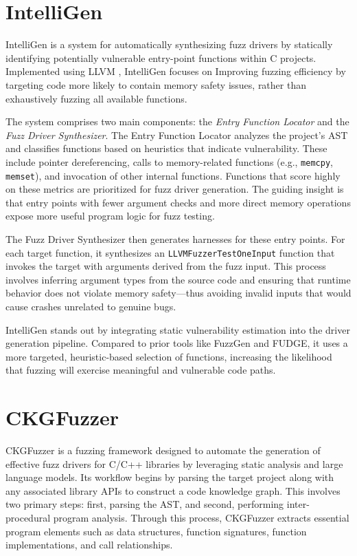 \documentclass[
  a4paper,
]{scrreprt}
\theoremstyle{definition}
\theoremstyle{remark}
\begin{document}
\section{IntelliGen}\label{intelligen}

IntelliGen \autocite{zhang2021} is a system for automatically
synthesizing fuzz drivers by statically identifying potentially
vulnerable entry-point functions within C projects. Implemented using
LLVM \autocite{llvm}, IntelliGen focuses on Improving fuzzing efficiency
by targeting code more likely to contain memory safety issues, rather
than exhaustively fuzzing all available functions.

The system comprises two main components: the \emph{Entry Function
Locator} and the \emph{Fuzz Driver Synthesizer}. The Entry Function
Locator analyzes the project's AST and classifies functions based on
heuristics that indicate vulnerability. These include pointer
dereferencing, calls to memory-related functions (e.g., \texttt{memcpy},
\texttt{memset}), and invocation of other internal functions. Functions
that score highly on these metrics are prioritized for fuzz driver
generation. The guiding insight is that entry points with fewer argument
checks and more direct memory operations expose more useful program
logic for fuzz testing.

The Fuzz Driver Synthesizer then generates harnesses for these entry
points. For each target function, it synthesizes an
\texttt{LLVMFuzzerTestOneInput} function that invokes the target with
arguments derived from the fuzz input. This process involves inferring
argument types from the source code and ensuring that runtime behavior
does not violate memory safety---thus avoiding invalid inputs that would
cause crashes unrelated to genuine bugs.

IntelliGen stands out by integrating static vulnerability estimation
into the driver generation pipeline. Compared to prior tools like
FuzzGen and FUDGE, it uses a more targeted, heuristic-based selection of
functions, increasing the likelihood that fuzzing will exercise
meaningful and vulnerable code paths.

\section{CKGFuzzer}\label{ckgfuzzer}

CKGFuzzer \autocite{xu2024} is a fuzzing framework designed to automate
the generation of effective fuzz drivers for C/C++ libraries by
leveraging static analysis and large language models. Its workflow
begins by parsing the target project along with any associated library
APIs to construct a code knowledge graph. This involves two primary
steps: first, parsing the AST, and second, performing inter-procedural
program analysis. Through this process, CKGFuzzer extracts essential
program elements such as data structures, function signatures, function
implementations, and call relationships.
\end{document}
